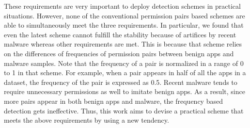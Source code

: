 \documentclass{ieeeaccess}
\begin{document}
These requirements are very important to deploy detection schemes in practical situations.
However, none of the conventional permission pairs based schemes are able to simultaneously meet the three requirements.
In particular, we found that even the latest scheme \cite{arora2019permpair} cannot fulfill the stability because of artifices by recent malware whereas other requirements are met. 
This is because that scheme relies on the differences of frequencies of permission pairs between benign apps and malware samples.
Note that the frequency of a pair is normalized in a range of 0 to 1 in that scheme.
For example, when a pair appears in half of all the apps in a dataset, the frequency of the pair is expressed as 0.5.
Recent malware tends to require unnecessary permissions as well to imitate benign apps.
As a result, since more pairs appear in both benign apps and malware, the frequency based detection gets ineffective.
Thus, this work aims to devise a practical scheme that meets the above requirements by using a new tendency.
\end{document}
